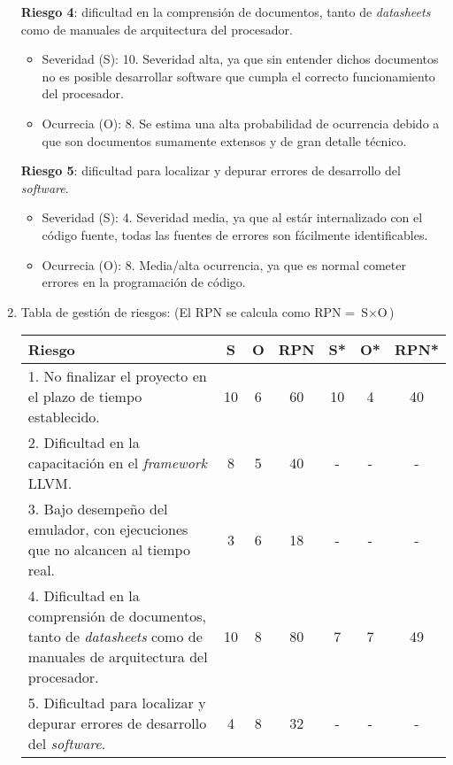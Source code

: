 \begin{enumerate}[label=\alph*)]
  \textbf{Riesgo 4}: dificultad en la comprensión de documentos, tanto de \textit{datasheets} como de manuales de arquitectura del procesador.


  \begin{itemize}
  \item Severidad (S): 10. Severidad alta, ya que sin entender dichos documentos no es posible desarrollar software que cumpla el correcto funcionamiento del procesador.
  \item Ocurrecia (O): 8. Se estima una alta probabilidad de ocurrencia debido a que son documentos sumamente extensos y de gran detalle técnico.
  \end{itemize}

  \textbf{Riesgo 5}: dificultad para localizar y depurar errores de desarrollo del \textit{software}.


  \begin{itemize}
  \item Severidad (S): 4. Severidad media, ya que al estár internalizado con el código fuente, todas las fuentes de errores son fácilmente identificables.
  \item Ocurrecia (O): 8. Media/alta ocurrencia, ya que es normal cometer errores en la programación de código.
  \end{itemize}


\item Tabla de gestión de riesgos: (El RPN se calcula como RPN = $\text{S} \times \text{O}$)


  \begin{table}[htpb]
    \centering
    \begin{tabularx}{\linewidth}{@{}|X|c|c|c|c|c|c|@{}}
      \hline
      \rowcolor[HTML]{C0C0C0}
      Riesgo & S & O & RPN & S* & O* & RPN* \\ \hline
      1. No finalizar el proyecto en el plazo de tiempo establecido. & 10  & 6  &  60   &  10  &  4  &   40   \\ \hline
      2. Dificultad en la capacitación en el \textit{framework} LLVM. & 8  & 5  &  40   &  -  &  -  &   -   \\ \hline
      3. Bajo desempeño del emulador, con ejecuciones que no alcancen al tiempo real. &  3 & 6  &  18   &  -  &  -  &   -   \\ \hline
      4. Dificultad en la comprensión de documentos, tanto de \textit{datasheets} como de manuales de arquitectura del procesador. & 10  & 8  &  80   &  7  &  7  &  49    \\ \hline
      5. Dificultad para localizar y depurar errores de desarrollo del \textit{software}. &  4 & 8  &  32   &  -  & -  &   -   \\ \hline
    \end{tabularx}
  \end{table}


\end{enumerate}
